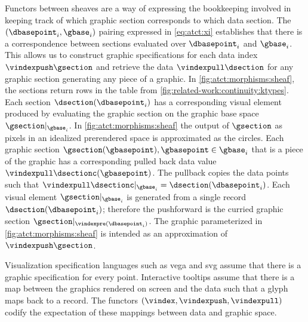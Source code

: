 \documentclass[10pt,journal,compsoc]{IEEEtran}
\theoremstyle{definition}
\theoremstyle{remark}
\begin{document}
Functors between sheaves are a way of expressing the bookkeeping involved in keeping track of which graphic section corresponds to which data section. The $(\dbasepoint_i, \gbase_i)$ pairing expressed in \autoref{eq:atct:xi} establishes that there is a correspondence between sections evaluated over $\dbasepoint_i$ and $\gbase_i$. This allows us to construct graphic specifications for each data index $\vindexpush\gsection$ and retrieve the data $\vindexpull\dsection$ for any graphic section generating any piece of a graphic. In \autoref{fig:atct:morphisms:sheaf}, the sections return rows in the table from \autoref{fig:related-work:continuity:ktypes}. Each section $\dsection(\dbasepoint_{i})$ has a corresponding visual element produced by evaluating the graphic section on the graphic base space $\gsection|_{\gbase_{i}}$. In \autoref{fig:atct:morphisms:sheaf} the output of $\gsection$ as pixels in an idealized prerendered space is approximated as the circles. Each graphic section $\gsection(\gbasepoint), \gbasepoint \in \gbase_{i}$ that is a piece of the graphic has a corresponding pulled back data value $\vindexpull\dsectionc(\gbasepoint)$. The pullback copies the data points such that $\vindexpull\dsectionc|_{\gbase_i} = \dsection(\dbasepoint_i)$. Each visual element $\gsection|_{\gbase_i}$ is generated from a single record $\dsection(\dbasepoint_i)$; therefore the pushforward is the curried graphic section $\gsection|_{\vindexpre(\dbasepoint_i)}$. The graphic parameterized in \autoref{fig:atct:morphisms:sheaf} is intended as an approximation of $\vindexpush\gsection$.

Visualization specification languages such as vega \cite{heerDeclarative2010} and svg \cite{quintScalable2003} assume that there is a graphic  specification for every point. Interactive tooltips assume that there is a map between the graphics rendered on screen and the data such that a glyph maps back to a record. The functors $(\vindex, \vindexpush, \vindexpull)$ codify the expectation of these mappings between data and graphic space. 
\end{document}
